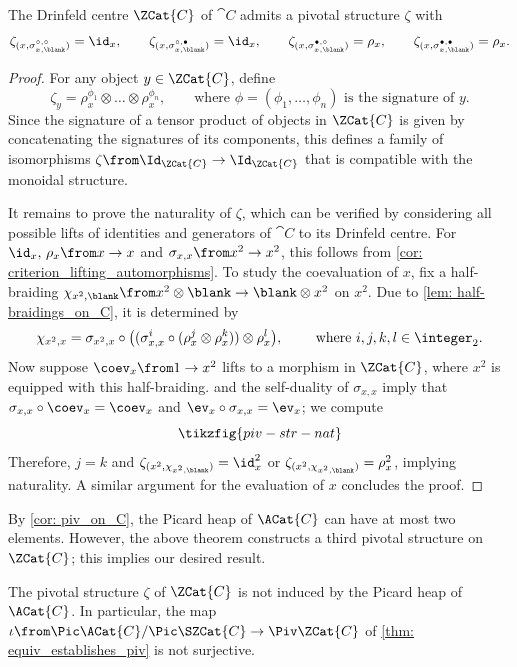 \begin{theorem}\label{thm: additional_pivotal_structure}
  The Drinfeld centre \(\ZCat{C}\) of \(\cat{C}\) admits a pivotal structure \(\zeta\) with
  \[
    \zeta_{(x, \sigma^{\circ, \circ}_{x,\blank})}= \id_x, \qquad
    \zeta_{(x, \sigma^{\circ, \bullet}_{x,\blank})}= \id_x, \qquad
    \zeta_{(x, \sigma^{\bullet, \circ}_{x,\blank})}= \rho_x, \qquad
    \zeta_{(x, \sigma^{\bullet, \bullet}_{x,\blank})}= \rho_x.
  \]
\end{theorem}
\begin{proof}
  For any object \(y\in \ZCat{C}\), define
  \[
    \zeta_y = \rho_x^{\phi_1}\otimes\dots\otimes \rho_x^{\phi_n}, \qquad \text{where \(\phi=(\phi_1, \dots, \phi_n)\) is the signature of \(y\)}.
  \]
  Since the signature of a tensor product of objects in \(\ZCat{C}\) is given by concatenating the signatures of its components,
  this defines a family of isomorphisms \(\zeta \from \Id_{\ZCat{C}} \to \Id_{\ZCat{C}}\)
  that is compatible with the monoidal structure.

  It remains to prove the naturality of \(\zeta\),
  which can be verified by considering all possible lifts of identities and generators of \(\cat{C}\) to its Drinfeld centre.
  For \(\id_x,\, \rho_x \from x \to x\) and \(\sigma_{x,x}\from x^2 \to x^2\), this follows from \cref{cor: criterion_lifting_automorphisms}.
  To study the coevaluation of \(x\),
  fix a half-braiding \(\chi_{x^2, \blank}\from x^2 \otimes \blank \to \blank \otimes x^2\) on \(x^2\).
  Due to \cref{lem: half-braidings_on_C}, it is determined by
  \[
    \chi_{x^2, x} = \sigma_{x^2,x} \circ \big((\sigma_{x,x}^i \circ (\rho_x^j \otimes \rho_x^k)) \otimes \rho_x^l \big), \qquad \text{ where } i,j,k,l \in \integer_2.
  \]
  Now suppose \(\coev_x \from 1 \to x^2\) lifts to a morphism in \(\ZCat{C}\),
  where \(x^2\) is equipped with this half-braiding.
   and the self-duality of \(\sigma_{x,x}\) imply that
  \(\sigma_{x,x} \circ \coev_x = \coev_x\) and \(\ev_x \circ \sigma_{x,x} = \ev_x\);
  we compute
  \[
    \tikzfig{piv-str-nat}
  \]
  Therefore, \(j=k\) and \(\zeta_{(x^2, \chi_{x^2, \blank})} = \id_x^2\) or \(\zeta_{(x^2, \chi_{x^2, \blank})} = \rho_x^2\),
  implying naturality.
  A similar argument for the evaluation of \(x\) concludes the proof.
\end{proof}

By \cref{cor: piv_on_C}, the Picard heap of \(\ACat{C}\) can have at most two elements.
However, the above theorem constructs a third pivotal structure on \(\ZCat{C}\);
this implies our desired result.

\begin{theorem}\label{thm: non_induced_pivotal_structure}
  The pivotal structure \(\zeta\) of \(\ZCat{C}\) is not induced by the Picard heap of \(\ACat{C}\).
  In particular, the map \(\iota \from \Pic \ACat{C} / \Pic \SZCat{C} \to \Piv \ZCat{C}\)
  of \cref{thm: equiv_establishes_piv}
  is not surjective.
\end{theorem}

